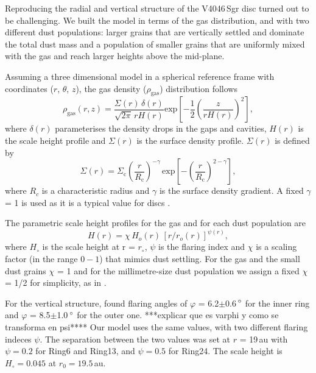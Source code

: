 \documentclass[letters,usenatbib,times]{mnras}
\begin{document}
Reproducing  the  radial and vertical structure of the V4046\,Sgr disc turned out to be challenging.  We  built the model in terms of the gas distribution, and with  two different dust populations: larger grains that are vertically settled and dominate the total dust mass and a  population of smaller grains that are uniformly mixed with the gas and reach larger heights above the mid-plane. 

Assuming a three dimensional model in a spherical reference frame with coordinates ($r$, $\theta$, $z$), the gas density ($\rho_{\mathrm{gas}}$) distribution follows
\begin{equation}
  \rho_{\mathrm{gas}}(r,z) =\frac{\Sigma(r) \,\delta(r)}{\sqrt{2\pi} \,r H(r)}  \mathrm{exp}\left[-\frac{1}{2} \left(\frac{z}{r H(r)}\right)^2\right],
\end{equation}
where $\delta(r)$  parameterises the density drops in the gaps and cavities, $H(r)$ is the scale height profile and $\Sigma(r)$ is the surface density profile. $\Sigma(r)$ is defined by
\begin{equation}
  \Sigma(r) = \Sigma_\mathrm{c} \left(\frac{r}{R_\mathrm{c}}\right)^{-\gamma}  \, \mathrm{exp}\left[-\left(\frac{r}{R_\mathrm{c}}\right)^{2-\gamma}\right],
\end{equation}
where $R_c$ is a characteristic radius and $\gamma$ is the surface density gradient. A fixed $\gamma$ = 1 is used as it is a typical value for discs \citep{Andrews_2009,Andrews_2010}.

The parametric scale height profiles for the gas and for each dust population are 
\begin{equation}
    \label{scale}
  H(r)=\chi \, H_{o}(r) \, [r/r_{o}(r)]^{\psi(r)},
\end{equation}
where $H_\circ$ is the scale height at r = $r_\circ$, $\psi$ is the flaring index and $\chi$ is a scaling factor (in the range $0-1$) that mimics dust settling. For the gas and the small dust grains $\chi$ = 1 and for the millimetre-size dust population we assign a fixed $\chi$ = 1/2 for simplicity, as in \citet{Rosenfeld_2013}.


For the vertical structure, \citet{dOrazi} found flaring angles of $\varphi$ = 6.2$\pm$0.6\,$\hbox{$^\circ$}$ for the inner ring and $\varphi$ = 8.5$\pm$1.0\,$\hbox{$^\circ$}$ for the outer one. ***explicar que es varphi y como se transforma en psi**** Our model uses the same values, with two   different flaring indeces $\psi$. The separation between the two values was set at $r$ = 19\,au with $\psi=0.2$ for  Ring6 and Ring13, and $\psi=0.5$ for Ring24. The scale height is  $H_\circ = 0.045$ at $r_0 = 19.5$\,au.
\end{document}
